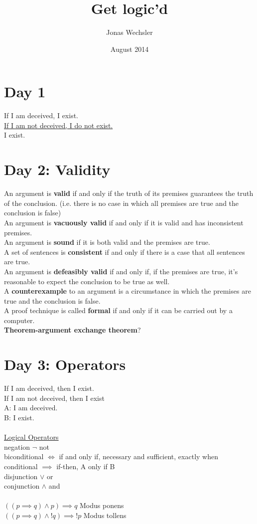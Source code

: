 \documentclass{article}
\title{Get logic'd}
\author{Jonas Wechsler}
\date{August 2014}
\begin{document}
	\maketitle

	\section{Day 1}
	If I am deceived, I exist.
	\\ \underline{If I am not deceived, I do not exist.}
	\\ I exist.
	\section{Day 2: Validity}
	An argument is \textbf{valid} if and only if the truth of its premises guarantees the truth of the conclusion. (i.e. there is no case in which all premises are true and the conclusion is false)
	\\An argument is \textbf{vacuously valid} if and only if it is valid and has inconsistent premises.
	\\An argument is \textbf{sound} if it is both valid and the premises are true.
	\\A set of sentences is \textbf{consistent} if and only if there is a case that all sentences are true.
	\\An argument is \textbf{defeasibly valid} if and only if, if the premises are true, it's reasonable to expect the conclusion to be true as well.
	\\A \textbf{counterexample} to an argument is a circumstance in which the premises are true and the conclusion is false.
	\\A proof technique is called \textbf{formal} if and only if it can be carried out by a computer.
	\\\textbf{Theorem-argument exchange theorem}?
	\section{Day 3: Operators}
	If I am deceived, then I exist.\\
	If I am not deceived, then I exist\\
	A: I am deceived.\\
	B: I exist.\\
	\\
	\underline{Logical Operators}\\
	negation $\lnot$ not\\
	biconditional $\iff$ if and only if, necessary and sufficient, exactly when\\
	conditional $\implies$ if-then, A only if B\\
	disjunction $\lor$ or\\
	conjunction $\land$ and\\
	\\
	$((p \implies q) \land  p)\implies q$ Modus ponens\\
	$((p \implies q) \land  !q)\implies !p$ Modus tollens\\
\end{document}
